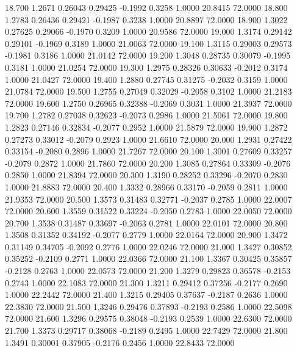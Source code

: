   18.700   1.2671   0.26043   0.29425  -0.1992   0.3258   1.0000  20.8415  72.0000
  18.800   1.2783   0.26436   0.29421  -0.1987   0.3238   1.0000  20.8897  72.0000
  18.900   1.3022   0.27625   0.29066  -0.1970   0.3209   1.0000  20.9586  72.0000
  19.000   1.3174   0.29142   0.29101  -0.1969   0.3189   1.0000  21.0063  72.0000
  19.100   1.3115   0.29003   0.29573  -0.1981   0.3186   1.0000  21.0142  72.0000
  19.200   1.3048   0.28735   0.30079  -0.1995   0.3181   1.0000  21.0254  72.0000
  19.300   1.2975   0.28326   0.30633  -0.2012   0.3174   1.0000  21.0427  72.0000
  19.400   1.2880   0.27745   0.31275  -0.2032   0.3159   1.0000  21.0784  72.0000
  19.500   1.2755   0.27049   0.32029  -0.2058   0.3102   1.0000  21.2183  72.0000
  19.600   1.2750   0.26965   0.32388  -0.2069   0.3031   1.0000  21.3937  72.0000
  19.700   1.2782   0.27038   0.32623  -0.2073   0.2986   1.0000  21.5061  72.0000
  19.800   1.2823   0.27146   0.32834  -0.2077   0.2952   1.0000  21.5879  72.0000
  19.900   1.2872   0.27273   0.33012  -0.2079   0.2923   1.0000  21.6610  72.0000
  20.000   1.2931   0.27422   0.33154  -0.2080   0.2896   1.0000  21.7267  72.0000
  20.100   1.3001   0.27609   0.33257  -0.2079   0.2872   1.0000  21.7860  72.0000
  20.200   1.3085   0.27864   0.33309  -0.2076   0.2850   1.0000  21.8394  72.0000
  20.300   1.3190   0.28252   0.33296  -0.2070   0.2830   1.0000  21.8883  72.0000
  20.400   1.3332   0.28966   0.33170  -0.2059   0.2811   1.0000  21.9353  72.0000
  20.500   1.3573   0.31483   0.32771  -0.2037   0.2785   1.0000  22.0007  72.0000
  20.600   1.3559   0.31522   0.33224  -0.2050   0.2783   1.0000  22.0050  72.0000
  20.700   1.3538   0.31487   0.33697  -0.2063   0.2781   1.0000  22.0101  72.0000
  20.800   1.3508   0.31352   0.34192  -0.2077   0.2779   1.0000  22.0164  72.0000
  20.900   1.3472   0.31149   0.34705  -0.2092   0.2776   1.0000  22.0246  72.0000
  21.000   1.3427   0.30852   0.35252  -0.2109   0.2771   1.0000  22.0366  72.0000
  21.100   1.3367   0.30425   0.35857  -0.2128   0.2763   1.0000  22.0573  72.0000
  21.200   1.3279   0.29823   0.36578  -0.2153   0.2743   1.0000  22.1083  72.0000
  21.300   1.3211   0.29412   0.37256  -0.2177   0.2690   1.0000  22.2442  72.0000
  21.400   1.3215   0.29405   0.37637  -0.2187   0.2636   1.0000  22.3830  72.0000
  21.500   1.3246   0.29476   0.37893  -0.2193   0.2586   1.0000  22.5098  72.0000
  21.600   1.3296   0.29575   0.38048  -0.2193   0.2539   1.0000  22.6300  72.0000
  21.700   1.3373   0.29717   0.38068  -0.2189   0.2495   1.0000  22.7429  72.0000
  21.800   1.3491   0.30001   0.37905  -0.2176   0.2456   1.0000  22.8433  72.0000
